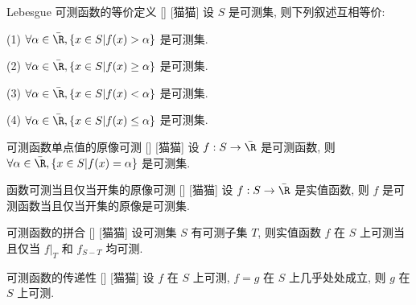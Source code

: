 \documentclass[UTF8]{ctexart}
\begin{document}
            \begin{ppt}
                {Lebesgue 可测函数的等价定义}
                []
                [猫猫]
                设 \(S\) 是可测集, 则下列叙述互相等价: 

                (1) \(\forall\alpha\in\bar{\R}, \{x\in S|f(x)>\alpha\}\) 是可测集. 

                (2) \(\forall\alpha\in\bar{\R}, \{x\in S|f(x)\geq\alpha\}\) 是可测集. 

                (3) \(\forall\alpha\in\bar{\R}, \{x\in S|f(x)<\alpha\}\) 是可测集. 

                (4) \(\forall\alpha\in\bar{\R}, \{x\in S|f(x)\leq\alpha\}\) 是可测集. 
            \end{ppt}
            
            \begin{ppt}
                {可测函数单点值的原像可测}
                []
                [猫猫]
                设 \(f:S\to\bar{\R}\) 是可测函数, 则 \(\forall\alpha\in\bar{\R}, \{x\in S|f(x)=\alpha\}\) 是可测集. 
            \end{ppt}
            
            \begin{ppt}
                {函数可测当且仅当开集的原像可测}
                []
                [猫猫]
                设 \(f:S\to\bar{\R}\) 是实值函数, 则 \(f\) 是可测函数当且仅当开集的原像是可测集. 
            \end{ppt}
            
            \begin{ppt}
                {可测函数的拼合}
                []
                [猫猫]
                设可测集 \(S\) 有可测子集 \(T\), 则实值函数 \(f\) 在 \(S\) 上可测当且仅当 \(f|_T\) 和 \(f_{S-T}\) 均可测.
            \end{ppt}
            
            \begin{ppt}
                {可测函数的传递性}
                []
                [猫猫]
                设 \(f\) 在 \(S\) 上可测, \(f=g\) 在 \(S\) 上几乎处处成立, 则 \(g\) 在 \(S\) 上可测. 
            \end{ppt}
            
\end{document}
